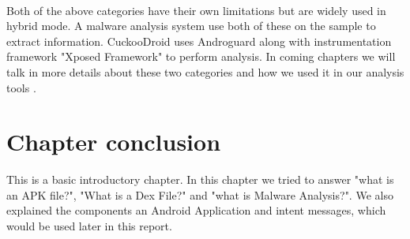 \documentclass[../main.tex]{subfile}
\begin{document}
		\paragraph{} Both of the above categories have their own limitations but are widely used in hybrid mode. A malware analysis system use both of these on the sample to extract information. CuckooDroid uses Androguard along with instrumentation framework "Xposed Framework" to perform analysis. In coming chapters we will talk in more details about these two categories and how we used it in our analysis tools \cite{cuckoodroid_github}.
		\section*{Chapter conclusion} This is a basic introductory chapter. In this chapter we tried to answer "what is an APK file?", "What is a Dex File?" and "what is Malware Analysis?". We also explained the components an Android Application and intent messages, which would be used later in this report.
\end{document}
